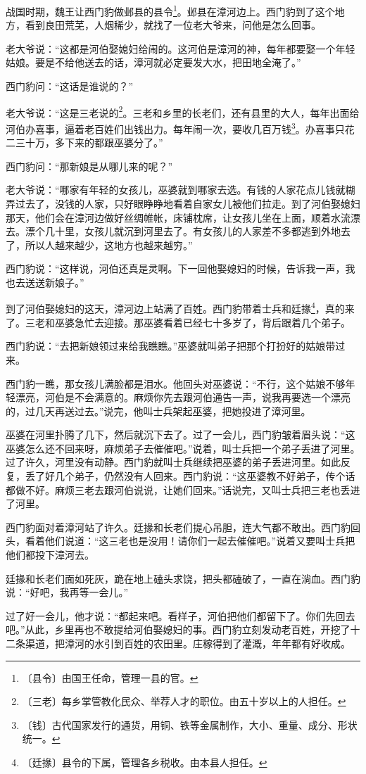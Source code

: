 \documentclass[12pt,UTF-8,openany]{ctexbook}
\begin{document}
\begin{large}
    
    战国时期，魏王让西门豹做邺县的县令\footnote{〔县令〕由国王任命，管理一县的官。}。邺县在漳河边上。西门豹到了这个地方，看到良田荒芜，人烟稀少，就找了一位老大爷来，问他是怎么回事。
    
    老大爷说：“这都是河伯娶媳妇给闹的。这河伯是漳河的神，每年都要娶一个年轻姑娘。要是不给他送去的话，漳河就必定要发大水，把田地全淹了。”
    
    西门豹问：“这话是谁说的？”
    
    老大爷说：“这是三老说的\footnote{〔三老〕每乡掌管教化民众、举荐人才的职位。由五十岁以上的人担任。}。三老和乡里的长老们，还有县里的大人，每年出面给河伯办喜事，逼着老百姓们出钱出力。每年闹一次，要收几百万钱\footnote{〔钱〕古代国家发行的通货，用铜、铁等金属制作，大小、重量、成分、形状统一。}。办喜事只花二三十万，多下来的都跟巫婆分了。”
    
    西门豹问：“那新娘是从哪儿来的呢？”
    
    老大爷说：“哪家有年轻的女孩儿，巫婆就到哪家去选。有钱的人家花点儿钱就糊弄过去了，没钱的人家，只好眼睁睁地看着自家女儿被他们拉走。到了河伯娶媳妇那天，他们会在漳河边做好丝绸帷帐，床铺枕席，让女孩儿坐在上面，顺着水流漂去。漂个几十里，女孩儿就沉到河里去了。有女孩儿的人家差不多都逃到外地去了，所以人越来越少，这地方也越来越穷。” 
    
    西门豹说：“这样说，河伯还真是灵啊。下一回他娶媳妇的时候，告诉我一声，我也去送送新娘子。”
    
    到了河伯娶媳妇的这天，漳河边上站满了百姓。西门豹带着士兵和廷掾\footnote{〔廷掾〕县令的下属，管理各乡税收。由本县人担任。}，真的来了。三老和巫婆急忙去迎接。那巫婆看着已经七十多岁了，背后跟着几个弟子。
    
    西门豹说：“去把新娘领过来给我瞧瞧。”巫婆就叫弟子把那个打扮好的姑娘带过来。
    
    西门豹一瞧，那女孩儿满脸都是泪水。他回头对巫婆说：“不行，这个姑娘不够年轻漂亮，河伯是不会满意的。麻烦你先去跟河伯通告一声，说我再要选一个漂亮的，过几天再送过去。”说完，他叫士兵架起巫婆，把她投进了漳河里。
    
    巫婆在河里扑腾了几下，然后就沉下去了。过了一会儿，西门豹皱着眉头说：“这巫婆怎么还不回来呀，麻烦弟子去催催吧。”说着，叫士兵把一个弟子丢进了河里。过了许久，河里没有动静。西门豹就叫士兵继续把巫婆的弟子丢进河里。如此反复，丢了好几个弟子，仍然没有人回来。西门豹说：“这巫婆教不好弟子，传个话都做不好。麻烦三老去跟河伯说说，让她们回来。”话说完，又叫士兵把三老也丢进了河里。
    
    西门豹面对着漳河站了许久。廷掾和长老们提心吊胆，连大气都不敢出。西门豹回头，看着他们说道：“这三老也是没用！请你们一起去催催吧。”说着又要叫士兵把他们都投下漳河去。
    
    廷掾和长老们面如死灰，跪在地上磕头求饶，把头都磕破了，一直在淌血。西门豹说：“好吧，我再等一会儿。”
    
    过了好一会儿，他才说：“都起来吧。看样子，河伯把他们都留下了。你们先回去吧。”从此，乡里再也不敢提给河伯娶媳妇的事。西门豹立刻发动老百姓，开挖了十二条渠道，把漳河的水引到百姓的农田里。庄稼得到了灌溉，年年都有好收成。
    
\end{large}
\end{document}
